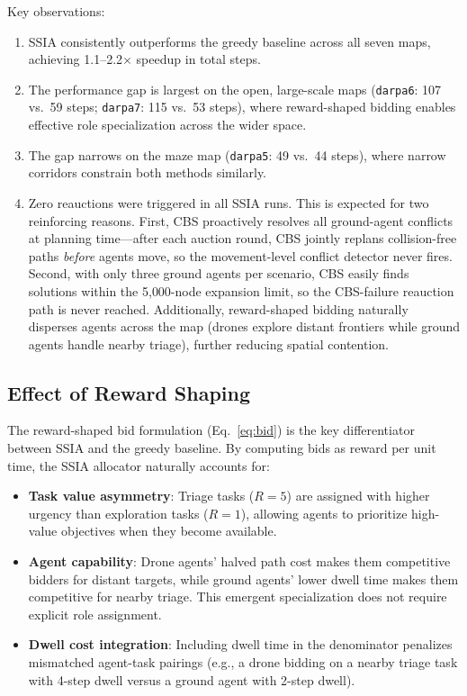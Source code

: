 \documentclass[conference]{IEEEtran}
\begin{document}
Key observations:
\begin{enumerate}
    \item SSIA consistently outperforms the greedy baseline across all seven maps, achieving 1.1--2.2$\times$ speedup in total steps.
    \item The performance gap is largest on the open, large-scale maps (\texttt{darpa6}: 107 vs.\ 59 steps; \texttt{darpa7}: 115 vs.\ 53 steps), where reward-shaped bidding enables effective role specialization across the wider space.
    \item The gap narrows on the maze map (\texttt{darpa5}: 49 vs.\ 44 steps), where narrow corridors constrain both methods similarly.
    \item Zero reauctions were triggered in all SSIA runs. This is expected for two reinforcing reasons. First, CBS proactively resolves all ground-agent conflicts at planning time---after each auction round, CBS jointly replans collision-free paths \emph{before} agents move, so the movement-level conflict detector never fires. Second, with only three ground agents per scenario, CBS easily finds solutions within the 5{,}000-node expansion limit, so the CBS-failure reauction path is never reached. Additionally, reward-shaped bidding naturally disperses agents across the map (drones explore distant frontiers while ground agents handle nearby triage), further reducing spatial contention.
\end{enumerate}

\subsection{Effect of Reward Shaping}

The reward-shaped bid formulation (Eq.~\ref{eq:bid}) is the key differentiator between SSIA and the greedy baseline. By computing bids as reward per unit time, the SSIA allocator naturally accounts for:
\begin{itemize}
    \item \textbf{Task value asymmetry}: Triage tasks ($R=5$) are assigned with higher urgency than exploration tasks ($R=1$), allowing agents to prioritize high-value objectives when they become available.
    \item \textbf{Agent capability}: Drone agents' halved path cost makes them competitive bidders for distant targets, while ground agents' lower dwell time makes them competitive for nearby triage. This emergent specialization does not require explicit role assignment.
    \item \textbf{Dwell cost integration}: Including dwell time in the denominator penalizes mismatched agent-task pairings (e.g., a drone bidding on a nearby triage task with 4-step dwell versus a ground agent with 2-step dwell).
\end{itemize}
\end{document}
